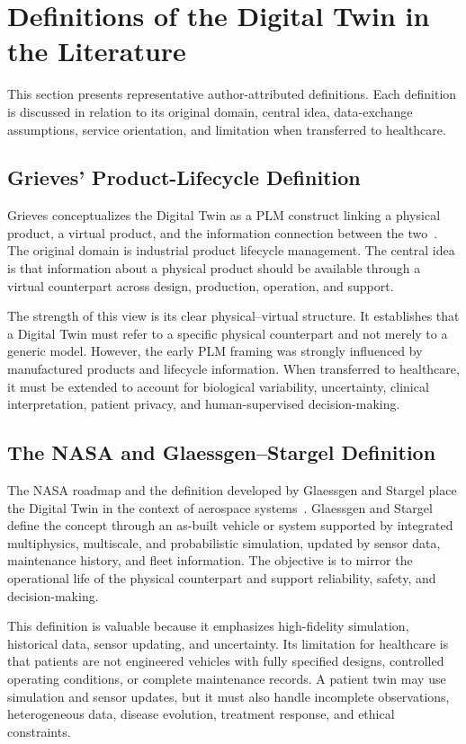 \section{Definitions of the Digital Twin in the Literature}
This section presents representative author-attributed definitions. Each definition is discussed in relation to its original domain, central idea, data-exchange assumptions, service orientation, and limitation when transferred to healthcare.

\subsection{Grieves' Product-Lifecycle Definition}
Grieves conceptualizes the Digital Twin as a PLM construct linking a physical product, a virtual product, and the information connection between the two~\cite{grieves2005product,grieves2014digital}. The original domain is industrial product lifecycle management. The central idea is that information about a physical product should be available through a virtual counterpart across design, production, operation, and support.

The strength of this view is its clear physical--virtual structure. It establishes that a Digital Twin must refer to a specific physical counterpart and not merely to a generic model. However, the early PLM framing was strongly influenced by manufactured products and lifecycle information. When transferred to healthcare, it must be extended to account for biological variability, uncertainty, clinical interpretation, patient privacy, and human-supervised decision-making.

\subsection{The NASA and Glaessgen--Stargel Definition}
The NASA roadmap and the definition developed by Glaessgen and Stargel place the Digital Twin in the context of aerospace systems~\cite{shafto2010modeling,glaessgen2012digital}. Glaessgen and Stargel define the concept through an as-built vehicle or system supported by integrated multiphysics, multiscale, and probabilistic simulation, updated by sensor data, maintenance history, and fleet information. The objective is to mirror the operational life of the physical counterpart and support reliability, safety, and decision-making.

This definition is valuable because it emphasizes high-fidelity simulation, historical data, sensor updating, and uncertainty. Its limitation for healthcare is that patients are not engineered vehicles with fully specified designs, controlled operating conditions, or complete maintenance records. A patient twin may use simulation and sensor updates, but it must also handle incomplete observations, heterogeneous data, disease evolution, treatment response, and ethical constraints.

